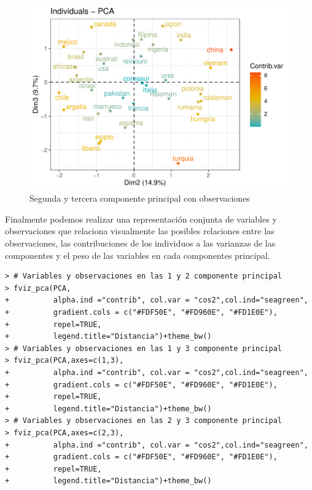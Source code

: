 \documentclass[12pt,twoside]{report}
\begin{document}
\begin{figure}[H]
\includegraphics[width=\textwidth]{../code/figures/segunda_tercera_obs.pdf}
\caption{Segunda y tercera componente principal con observaciones}
\label{fig:segunda_tercera_obs}
\end{figure} 

Finalmente podemos realizar una representación conjunta de variables y observaciones que relaciona visualmente las posibles relaciones entre las
observaciones, las contribuciones de los individuos a las varianzas de las componentes y el peso de las variables en cada componentes principal.

\begin{lstlisting}
> # Variables y observaciones en las 1 y 2 componente principal
> fviz_pca(PCA,
+          alpha.ind ="contrib", col.var = "cos2",col.ind="seagreen",
+          gradient.cols = c("#FDF50E", "#FD960E", "#FD1E0E"),
+          repel=TRUE,
+          legend.title="Distancia")+theme_bw()
> # Variables y observaciones en las 1 y 3 componente principal
> fviz_pca(PCA,axes=c(1,3),
+          alpha.ind ="contrib", col.var = "cos2",col.ind="seagreen",
+          gradient.cols = c("#FDF50E", "#FD960E", "#FD1E0E"),
+          repel=TRUE,
+          legend.title="Distancia")+theme_bw()
> # Variables y observaciones en las 2 y 3 componente principal
> fviz_pca(PCA,axes=c(2,3),
+          alpha.ind ="contrib", col.var = "cos2",col.ind="seagreen",
+          gradient.cols = c("#FDF50E", "#FD960E", "#FD1E0E"),
+          repel=TRUE,
+          legend.title="Distancia")+theme_bw()
\end{lstlisting}
\end{document}

